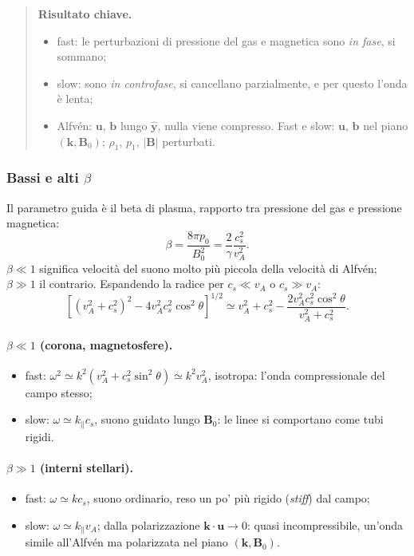 \begin{quote}
\textbf{Risultato chiave.}
\begin{itemize}
\item fast: le perturbazioni di pressione del gas e magnetica sono \emph{in fase}, si sommano;
\item slow: sono \emph{in controfase}, si cancellano parzialmente, e per questo l'onda è lenta;
\item Alfvén: $\mathbf{u}$, $\mathbf{b}$ lungo $\hat{\mathbf{y}}$, nulla viene compresso. Fast e slow: $\mathbf{u}$, $\mathbf{b}$ nel piano $(\mathbf{k},\mathbf{B}_0)$; $\rho_1$, $p_1$, $|\mathbf{B}|$ perturbati.
\end{itemize}
\end{quote}

\subsubsection{Bassi e alti $\beta$}

Il parametro guida è il beta di plasma, rapporto tra pressione del gas e pressione magnetica:
\begin{equation}
\beta=\frac{8\pi p_0}{B_0^2}=\frac{2}{\gamma}\frac{c_s^2}{v_A^2}.
\end{equation}
$\beta\ll1$ significa velocità del suono molto più piccola della velocità di Alfvén; $\beta\gg1$ il contrario. Espandendo la radice per $c_s\ll v_A$ o $c_s\gg v_A$:
\begin{equation}
\left[(v_A^2+c_s^2)^2-4v_A^2c_s^2\cos^2\theta\right]^{1/2}\simeq v_A^2+c_s^2-\frac{2v_A^2c_s^2\cos^2\theta}{v_A^2+c_s^2}.
\end{equation}

\paragraph{$\beta\ll1$ (corona, magnetosfere).}
\begin{itemize}
\item fast: $\omega^2\simeq k^2(v_A^2+c_s^2\sin^2\theta)\simeq k^2v_A^2$, isotropa: l'onda compressionale del campo stesso;
\item slow: $\omega\simeq k_\parallel c_s$, suono guidato lungo $\mathbf{B}_0$: le linee si comportano come tubi rigidi.
\end{itemize}

\paragraph{$\beta\gg1$ (interni stellari).}
\begin{itemize}
\item fast: $\omega\simeq kc_s$, suono ordinario, reso un po' più rigido (\emph{stiff}) dal campo;
\item slow: $\omega\simeq k_\parallel v_A$; dalla polarizzazione $\mathbf{k}\cdot\mathbf{u}\to0$: quasi incompressibile, un'onda simile all'Alfvén ma polarizzata nel piano $(\mathbf{k},\mathbf{B}_0)$.
\end{itemize}

